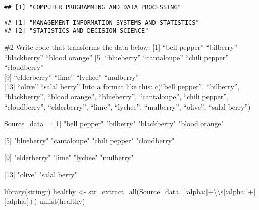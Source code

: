 \documentclass[
]{article}
\newenvironment{Shaded}{\begin{snugshade}}{\end{snugshade}}
\newcommand{\FunctionTok}[1]{\textcolor[rgb]{0.00,0.00,0.00}{#1}}
\newcommand{\NormalTok}[1]{#1}
\newcommand{\OtherTok}[1]{\textcolor[rgb]{0.56,0.35,0.01}{#1}}
\newcommand{\SpecialCharTok}[1]{\textcolor[rgb]{0.00,0.00,0.00}{#1}}
\newcommand{\StringTok}[1]{\textcolor[rgb]{0.31,0.60,0.02}{#1}}
\begin{document}
\begin{verbatim}
## [1] "COMPUTER PROGRAMMING AND DATA PROCESSING"
\end{verbatim}

\begin{Shaded}
\end{Shaded}

\begin{verbatim}
## [1] "MANAGEMENT INFORMATION SYSTEMS AND STATISTICS"
## [2] "STATISTICS AND DECISION SCIENCE"
\end{verbatim}

\#2 Write code that transforms the data below: {[}1{]} ``bell pepper''
``bilberry'' ``blackberry'' ``blood orange'' {[}5{]} ``blueberry''
``cantaloupe'' ``chili pepper'' ``cloudberry''\\
{[}9{]} ``elderberry'' ``lime'' ``lychee'' ``mulberry''\\
{[}13{]} ``olive'' ``salal berry'' Into a format like this: c(``bell
pepper'', ``bilberry'', ``blackberry'', ``blood orange'', ``blueberry'',
``cantaloupe'', ``chili pepper'', ``cloudberry'', ``elderberry'',
``lime'', ``lychee'', ``mulberry'', ``olive'', ``salal berry'')

\begin{Shaded}
\begin{Highlighting}[]
\NormalTok{Source\_data }\OtherTok{=} \StringTok{\textquotesingle{}[1] "bell pepper"  "bilberry"     "blackberry"   "blood orange"}

\StringTok{[5] "blueberry"    "cantaloupe"   "chili pepper" "cloudberry"  }

\StringTok{[9] "elderberry"   "lime"         "lychee"       "mulberry"    }

\StringTok{[13] "olive"        "salal berry"\textquotesingle{}}


\FunctionTok{library}\NormalTok{(stringr)}
\NormalTok{healthy }\OtherTok{\textless{}{-}} \FunctionTok{str\_extract\_all}\NormalTok{(Source\_data, }\StringTok{\textquotesingle{}[:alpha:]+}\SpecialCharTok{\textbackslash{}\textbackslash{}}\StringTok{s[:alpha:]+|[:alpha:]+\textquotesingle{}}\NormalTok{)}
\FunctionTok{unlist}\NormalTok{(healthy)}
\end{Highlighting}
\end{Shaded}
\end{document}
